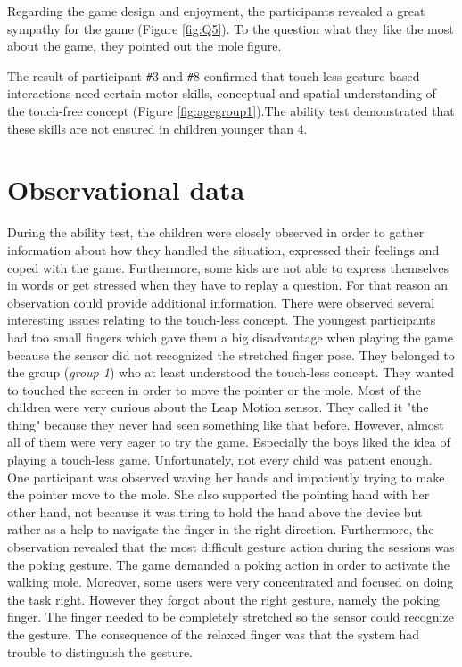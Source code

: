 Regarding the game design and enjoyment, the participants revealed a great sympathy for the game (Figure \ref{fig:Q5}).
To the question what they like the most about the game, they pointed out the mole figure.

The result of participant \texttt{\#}3 and \texttt{\#}8 confirmed that touch-less gesture based interactions need certain motor skills, conceptual and spatial understanding of the touch-free concept (Figure \ref{fig:agegroup1}).The ability test demonstrated that these skills are not ensured in children younger than 4.

\section{Observational data}
During the ability test, the children were closely observed in order to gather information about how they handled the situation, expressed their feelings and coped with the game. Furthermore, some kids are not able to express themselves in words or get stressed when they have to replay a question. For that reason an observation could provide additional information.
There were observed several interesting issues relating to the touch-less concept. The youngest participants had too small fingers which gave them a big disadvantage when playing the game because the sensor did not recognized the stretched finger pose. They belonged to the group (\textit{group 1}) who at least understood the touch-less concept. They wanted to touched the screen in order to move the pointer or the mole. 
Most of the children were very curious about the Leap Motion sensor. They called it "the thing" because they never had seen something like that before. However, almost all of them were very eager to try the game. Especially the boys liked the idea of playing a touch-less game.
Unfortunately, not every child was patient enough. One participant was observed waving her hands and impatiently trying to make the pointer move to the mole. She also supported the pointing hand with her other hand, not because it was tiring to hold the hand above the device but rather as a help to navigate the finger in the right direction.  
Furthermore, the observation revealed that the most difficult gesture action during the sessions was the poking gesture. The game demanded a poking action in order to activate the walking mole.
Moreover, some users were very concentrated and focused on doing the task right. However they forgot about the right gesture, namely the poking finger. The finger needed to be completely stretched so the sensor could recognize the gesture. The consequence of the relaxed finger was that the system had trouble to distinguish the gesture.

